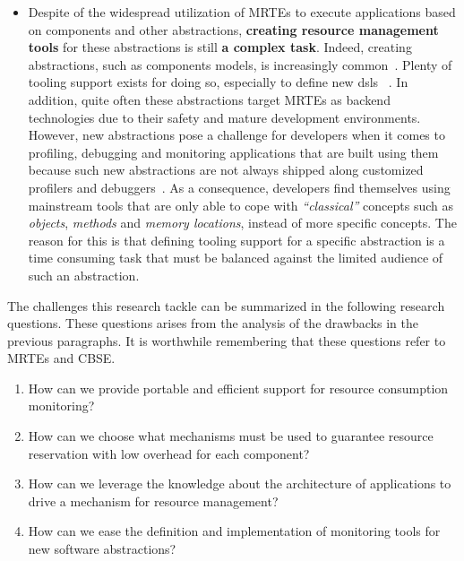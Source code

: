 \begin{itemize}
\item Despite of the widespread utilization of MRTEs to execute applications based on components and other abstractions, \textbf{creating resource management tools} for these abstractions is still \textbf{a complex task}.
Indeed, creating abstractions, such as components models, is increasingly common~\cite{van2000domain,hutchinson2011empirical,whittle2014state}.
Plenty of tooling support exists for doing so, especially to define new \glspl{dsl} ~\cite{van2000domain,Fowler:2010:DSL:1809745,raey,Merkle:2010:TMT:1869542.1869564,Eysholdt:2010:XIY:1869542.1869625}.
In addition, quite often these abstractions target MRTEs as backend technologies due to their safety and mature development environments.
However, new abstractions pose a challenge for developers when it comes to profiling, debugging and monitoring applications that are built using them because such new abstractions are not always shipped along customized profilers and debuggers~\cite{Kolomvatsos:2012:DAC:2148250.2148478,Wu:2008:GGD:1394966.1394970,Mannadiar:2010:DDM:1964571.1964595,Lindeman:2011:DDD:2047862.2047885,Wu:2005:TDL:1094855.1094920,Faith1998}.
As a consequence, developers find themselves using mainstream tools that are only able to cope with \textit{``classical''} concepts such as \textit{objects}, \textit{methods} and \textit{memory locations}, instead of more specific concepts.
The reason for this is that defining tooling support for a specific abstraction is a time consuming task that must be balanced against the limited audience of such an abstraction.
\end{itemize}
 
The challenges this research tackle can be summarized in the following research questions.
These questions arises from the analysis of the drawbacks in the previous paragraphs.
It is worthwhile remembering that these questions refer to MRTEs and CBSE.

\begin{enumerate}
\renewcommand{\theenumi}{\textit{RQ\arabic{enumi}}}

\item How can we provide portable and efficient support for resource consumption monitoring? \label{rq:rq1}

\item How can we choose what mechanisms must be used to guarantee resource reservation with low overhead for each component? \label{rq:rq2}

\item How can we leverage the knowledge about the architecture of applications to drive a mechanism for resource management? \label{rq:rq3}

\item How can we ease the definition and implementation of monitoring tools for new software abstractions? \label{rq:rq4}
\end{enumerate}
 
